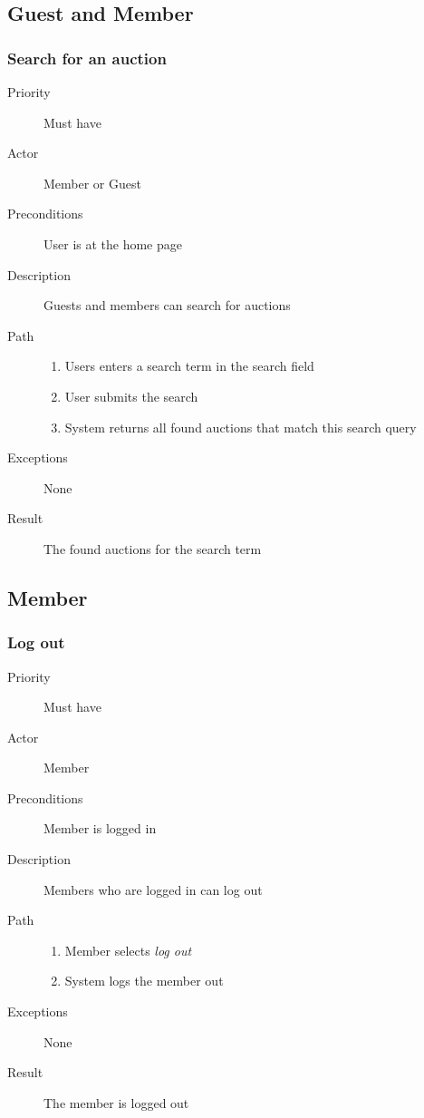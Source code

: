 \documentclass[a4paper, 12pt]{report}
\begin{document}
	\subsection{Guest and Member}
		\subsubsection{Search for an auction}
			\begin{description}
				\item[Priority] Must have
				\item[Actor] Member or Guest
				\item[Preconditions] User is at the home page
				\item[Description] Guests and members can search for auctions
				\item[Path]
 					\begin{enumerate}
						\item Users enters a search term in the search field
						\item User submits the search
						\item System returns all found auctions that match this search
						query
					\end{enumerate}
				\item[Exceptions] None
				\item[Result] The found auctions for the search term
			\end{description}
	\subsection{Member}
		\subsubsection{Log out}
			\begin{description}
				\item[Priority] Must have
				\item[Actor] Member
				\item[Preconditions] Member is logged in
				\item[Description] Members who are logged in can log out
				\item[Path]
 					\begin{enumerate}
						\item Member selects \emph{log out}
						\item System logs the member out
					\end{enumerate}
				\item[Exceptions] None
				\item[Result] The member is logged out
			\end{description}
\end{document}
